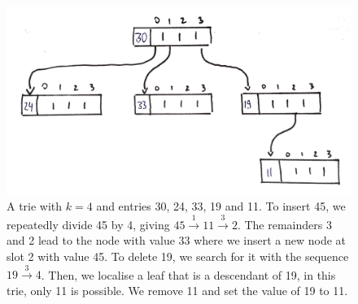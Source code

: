 
\begin{figure}
	\centering
	\includegraphics[width=\textwidth]{topic/imgtries/sampletrie_drawn_transp}
	\caption{ \small A trie with $k = 4$ and entries 30, 24, 33, 19 and 11.
		To insert 45, we repeatedly divide 45 by 4, giving
			$45 \overset{1}{\longrightarrow} 11  \overset{3}{\longrightarrow} 2$.
		The remainders 3 and 2 lead to the node with value 33 where we insert a new node at slot 2 with value 45.
		To delete 19, we search for it with the sequence $19 \overset{3}{\longrightarrow} 4$.
		Then, we localise a leaf that is a descendant of 19, in this trie, only 11 is possible.
		We remove 11 and set the value of 19 to 11.
		\label{fig:trie}}
\end{figure}


